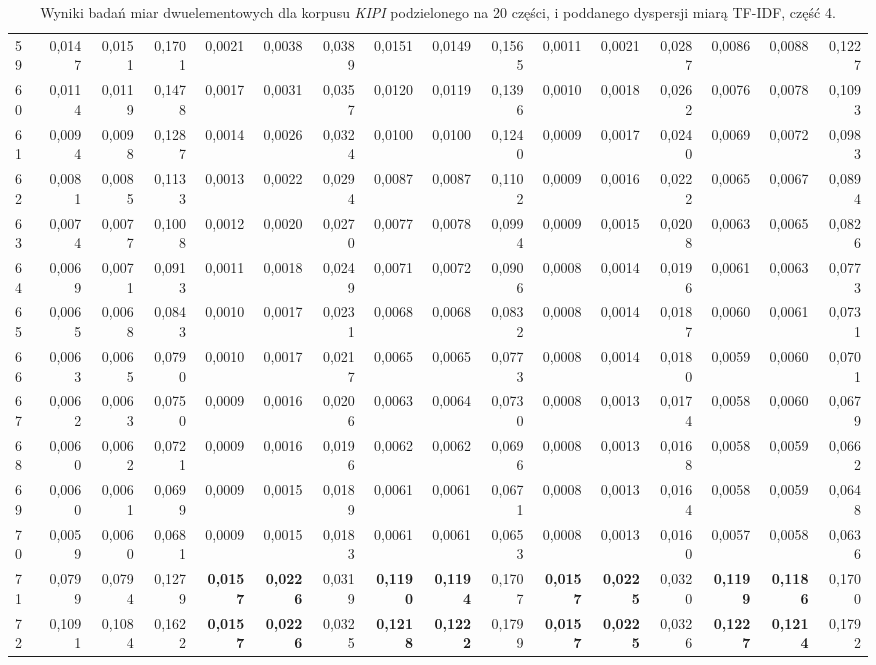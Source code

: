 \begin{table}[htp!]
\begin{adjustwidth}{-2cm}{}
\begin{tabular}{ l | *{15}{| r}}
59	&	0,0147	&	0,0151	&	0,1701	&	0,0021	&	0,0038	&	0,0389	&	0,0151	&	0,0149	&	0,1565	&	0,0011	&	0,0021	&	0,0287	&	0,0086	&	0,0088	&	0,1227	\\
60	&	0,0114	&	0,0119	&	0,1478	&	0,0017	&	0,0031	&	0,0357	&	0,0120	&	0,0119	&	0,1396	&	0,0010	&	0,0018	&	0,0262	&	0,0076	&	0,0078	&	0,1093	\\
61	&	0,0094	&	0,0098	&	0,1287	&	0,0014	&	0,0026	&	0,0324	&	0,0100	&	0,0100	&	0,1240	&	0,0009	&	0,0017	&	0,0240	&	0,0069	&	0,0072	&	0,0983	\\
62	&	0,0081	&	0,0085	&	0,1133	&	0,0013	&	0,0022	&	0,0294	&	0,0087	&	0,0087	&	0,1102	&	0,0009	&	0,0016	&	0,0222	&	0,0065	&	0,0067	&	0,0894	\\
63	&	0,0074	&	0,0077	&	0,1008	&	0,0012	&	0,0020	&	0,0270	&	0,0077	&	0,0078	&	0,0994	&	0,0009	&	0,0015	&	0,0208	&	0,0063	&	0,0065	&	0,0826	\\
64	&	0,0069	&	0,0071	&	0,0913	&	0,0011	&	0,0018	&	0,0249	&	0,0071	&	0,0072	&	0,0906	&	0,0008	&	0,0014	&	0,0196	&	0,0061	&	0,0063	&	0,0773	\\
65	&	0,0065	&	0,0068	&	0,0843	&	0,0010	&	0,0017	&	0,0231	&	0,0068	&	0,0068	&	0,0832	&	0,0008	&	0,0014	&	0,0187	&	0,0060	&	0,0061	&	0,0731	\\
66	&	0,0063	&	0,0065	&	0,0790	&	0,0010	&	0,0017	&	0,0217	&	0,0065	&	0,0065	&	0,0773	&	0,0008	&	0,0014	&	0,0180	&	0,0059	&	0,0060	&	0,0701	\\
67	&	0,0062	&	0,0063	&	0,0750	&	0,0009	&	0,0016	&	0,0206	&	0,0063	&	0,0064	&	0,0730	&	0,0008	&	0,0013	&	0,0174	&	0,0058	&	0,0060	&	0,0679	\\
68	&	0,0060	&	0,0062	&	0,0721	&	0,0009	&	0,0016	&	0,0196	&	0,0062	&	0,0062	&	0,0696	&	0,0008	&	0,0013	&	0,0168	&	0,0058	&	0,0059	&	0,0662	\\
69	&	0,0060	&	0,0061	&	0,0699	&	0,0009	&	0,0015	&	0,0189	&	0,0061	&	0,0061	&	0,0671	&	0,0008	&	0,0013	&	0,0164	&	0,0058	&	0,0059	&	0,0648	\\
70	&	0,0059	&	0,0060	&	0,0681	&	0,0009	&	0,0015	&	0,0183	&	0,0061	&	0,0061	&	0,0653	&	0,0008	&	0,0013	&	0,0160	&	0,0057	&	0,0058	&	0,0636	\\
71	&	0,0799	&	0,0794	&	0,1279	&	\textbf{0,0157}	&	\textbf{0,0226}	&	0,0319	&	\textbf{0,1190}	&	\textbf{0,1194}	&	0,1707	&	\textbf{0,0157}	&	\textbf{0,0225}	&	0,0320	&	\textbf{0,1199}	&	\textbf{0,1186}	&	0,1700	\\
72	&	0,1091	&	0,1084	&	0,1622	&	\textbf{0,0157}	&	\textbf{0,0226}	&	0,0325	&	\textbf{0,1218}	&	\textbf{0,1222}	&	0,1799	&	\textbf{0,0157}	&	\textbf{0,0225}	&	0,0326	&	\textbf{0,1227}	&	\textbf{0,1214}	&	0,1792	\\
	\bottomrule
\end{tabular}
 \end{adjustwidth}
\caption[Wyniki badań miar dwuelementowych dla korpusu \emph{KIPI} podzielonego na 20 części, i poddanego dyspersji miarą TF-IDF, część 4]{Wyniki badań miar dwuelementowych dla korpusu \emph{KIPI} podzielonego na 20 części, i poddanego dyspersji miarą TF-IDF, część 4.}
\label{KIPI_TFIDF_20_part_4}
\end{table}

